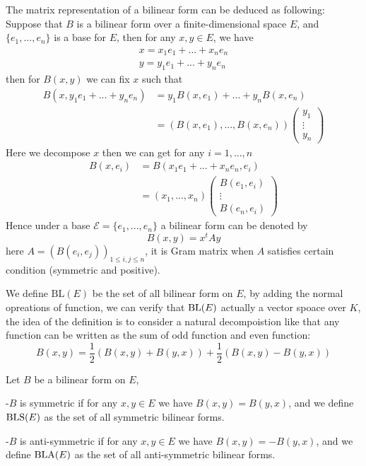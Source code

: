 \documentclass[en,geye,blue,normal,12pt]{elegantnote}
\begin{document}
\begin{remark}
  The matrix representation of a bilinear form can be deduced as following: Suppose that \(B\) is a bilinear form over a finite-dimensional space \(E\), and \(\{e_1,...,e_n\}\) is a base for \(E\), then for any \(x,y \in E\), we have 
  \begin{align*}
    x = x_1e_1+...+x_ne_n \\
    y = y_1e_1+...+y_ne_n
  \end{align*}
  then for \(B(x,y)\) we can fix \(x\) such that
  \begin{align*}
    B(x,y_1e_1+...+y_ne_n) &= y_1B(x,e_1)+...+y_nB(x,e_n) \\
    &= (B(x,e_1),...,B(x,e_n))\begin{pmatrix}
      y_1\\
      \vdots\\
      y_n
    \end{pmatrix}
  \end{align*}
  Here we decompose \(x\) then we can get for any \(i =1,...,n\)
  \begin{align*}
    B(x,e_i) &= B(x_1e_1+...+x_ne_n,e_i) \\
    &= (x_1,...,x_n)\begin{pmatrix}
      B(e_1,e_i)\\
      \vdots\\
      B(e_n,e_i)
    \end{pmatrix}
  \end{align*}
  Hence under a base \(\mathcal{E} = \{e_1,...,e_n\}\) a bilinear form can be denoted by 
  \[B(x,y) = x^tAy\]
  here \(A = (B(e_i,e_j))_{1\leq i,j\leq n}\), it is Gram matrix when \(A\) satisfies certain condition (symmetric and positive).
\end{remark}

We define \(\mathrm{BL}(E)\) be the set of all bilinear form on \(E\), by adding the normal opreations of function, we can verify that \(\mathrm{BL}(E)\) actually a vector spoace over \(K\), the idea of the definition is to consider a natural decompoistion like that any function can be written as the sum of odd function and even function:
\[B(x,y) = \frac{1}{2}(B(x,y)+B(y,x))+\frac{1}{2}(B(x,y)-B(y,x))\]

\begin{definition}
  Let \(B\) be a bilinear form on \(E\),

  -\(B\) is symmetric if for any \(x,y \in E\) we have \(B(x,y)=B(y,x)\), and we define \(\mathrm{BLS}(E)\) as the set of all symmetric bilinear forms.
  
  -\(B\) is anti-symmetric if for any \(x,y \in E\) we have \(B(x,y)= -B(y,x)\), and we define \(\mathrm{BLA}(E)\) as the set of all anti-symmetric bilinear forms.
\end{definition}
\end{document}
